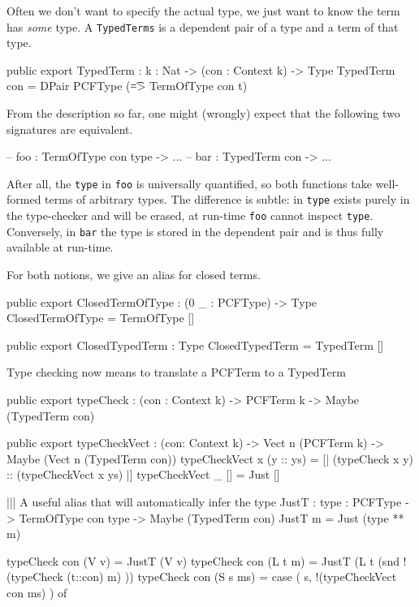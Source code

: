 Often we don't want to specify the actual type, we just want to know the term has \emph{some} type.
A \lstinline{TypedTerms} is a dependent pair of a type and a term of that type.
\begin{code}
public export
TypedTerm : {k : Nat} -> (con : Context k) -> Type
TypedTerm con = DPair PCFType (\t => TermOfType con t)
\end{code}

From the description so far, one might (wrongly) expect that the following two signatures are equivalent.
\begin{code}
-- foo : TermOfType con type -> ...
-- bar : TypedTerm con    -> ...
\end{code}
After all, the \lstinline{type} in \lstinline{foo} is universally quantified, so both functions take well-formed terms of arbitrary types.
The difference is subtle: in \lstinline{type} exists purely in the type-checker and will be erased, at run-time \lstinline{foo} cannot inspect \lstinline{type}. Conversely, in \lstinline{bar} the type is stored in the dependent pair and is thus fully available at run-time.


For both notions, we give an alias for closed terms.

\begin{code}
public export
ClosedTermOfType : (0 _ : PCFType) -> Type
ClosedTermOfType = TermOfType []

public export
ClosedTypedTerm : Type
ClosedTypedTerm = TypedTerm []
\end{code}

Type checking now means to translate a PCFTerm to a TypedTerm

\begin{code}
public export
typeCheck : (con : Context k) -> PCFTerm k -> Maybe (TypedTerm con)

public export
typeCheckVect : (con: Context k) -> Vect n (PCFTerm k) -> Maybe (Vect n (TypedTerm con))
typeCheckVect x (y :: ys) = [| (typeCheck x y) :: (typeCheckVect x ys) |]
typeCheckVect _ []        = Just []

||| A useful alias that will automatically infer the type
JustT : {type : PCFType} -> TermOfType con type -> Maybe (TypedTerm con)
JustT m = Just (type ** m)

typeCheck con (V v)    = JustT (V v) 
typeCheck con (L t m)  = JustT (L t (snd !(typeCheck (t::con) m) ))
typeCheck con (S s ms) = case ( s,  !(typeCheckVect con ms) ) of
\end{code}

